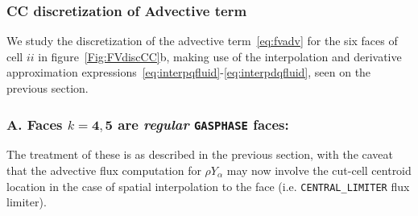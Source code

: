 \documentclass[12pt]{article}
\begin{document}

\subsubsection{CC discretization of Advective term}

We study the discretization of the advective term~\eqref{eq:fvadv} for the six faces of cell $ii$ in figure~\ref{Fig:FVdiscCC}b, making use of the interpolation and derivative approximation expressions~\eqref{eq:interpqfluid}-\eqref{eq:interpdqfluid}, seen on the previous section.

\subsubsection*{A. Faces $k=\mathbf{4},\mathbf{5}$ are \textit{regular} \texttt{GASPHASE} faces:}
The treatment of these is as described in the previous section, with the caveat that the advective flux computation for $\rho Y_\alpha$ may now involve the cut-cell centroid location in the case of spatial interpolation to the face (i.e. \texttt{CENTRAL\_LIMITER} flux limiter).
\end{document}
